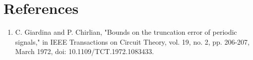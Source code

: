 \documentclass{article}
\begin{document}
\section{References}

\begin{enumerate}
    \item C. Giardina and P. Chirlian, "Bounds on the truncation error of periodic signals," in IEEE Transactions on Circuit Theory, vol. 19, no. 2, pp. 206-207, March 1972, doi: 10.1109/TCT.1972.1083433.
\end{enumerate}
\end{document}
